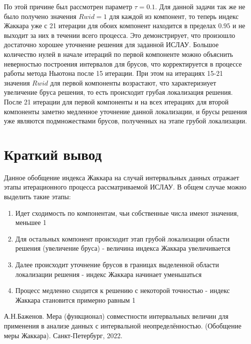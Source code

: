 \documentclass[12pt,a4paper]{article}
\begin{document}
По этой причине был рассмотрен параметр $\tau=0.1$. Для данной задачи так же не было получено значения $Rwid=1$ для каждой из компонент, то теперь индекс Жаккара уже с 21 итерации для обоих компонент находится в пределах $0.95$ и не выходит за них в течении всего процесса. Это демонстрирует, что произошло достаточно хорошее уточнение решения для заданной ИСЛАУ. Большое количество нулей в начале итераций по первой компоненте можно объяснить неверностью построения интервалов для брусов, что корректируется в процессе работы метода Ньютона после 15 итерации. При этом на итерациях 15-21 значения $Rwid$ для первой компоненты возрастают, что характеризиует увеличение бруса решения, то есть происходит грубая локализация решения. После 21 итерации для первой компоненты и на всех итерациях для второй компоненты заметно медленное уточнение данной локализации, и брусы решения уже являются подмножествами брусов, полученных на этапе грубой локализации.

\section{Краткий вывод}
Данное обобщение индекса Жаккара на случай интервальных данных отражает этапы итерационного процесса рассматриваемой ИСЛАУ. В общем случае можно выделить такие этапы:
\begin{enumerate}
    \item Идет сходимость по компонентам, чьи собственные числа имеют значения, меньшее 1
    \item Для остальных компонент происходит этап грубой локализации области решения (увеличение бруса) - величина индекса Жаккара увеличивается
    \item Далее происходит уточнение брусов в границах выделенной области локализации решения - индекс Жаккара начинает уменьшаться
    \item Процесс медленно сходится к решению с некоторой точностью - индекс Жаккара становится примерно равным 1
\end{enumerate}

\begin{thebibliography}{1}
    \bibitem{}
    А.Н.Баженов. Мера (функционал) совместности интервальных величин для применения в
    анализе данных с интервальной неопределённостью. (Обобщение меры Жаккара). Санкт-Петербург, 2022.
\end{thebibliography}
\end{document}
